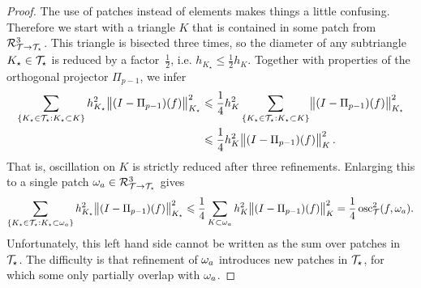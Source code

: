 \documentclass[thesis.tex]{subfiles}
\begin{document}
\begin{proof}

  The use of patches instead of elements makes things a little confusing. %
  Therefore we start with a triangle $K$ that is contained in some patch from $\mathcal{R}^3_{\mathcal{T} \to \mathcal{T}_\star}$.
  This triangle is bisected three times, so the diameter of any subtriangle $K_\star \in \mathcal{T}_\star$  is reduced by a factor~$\frac{1}{2}$, i.e. $h_{K_\star} \leq \frac{1}{2} h_K$.
  Together with properties of the orthogonal projector $\Pi_{p-1}$, we infer
  \begin{equation}
    \label{eq:strictosc}
  \begin{aligned}
    \sum_{\set{K_\star \in \mathcal{T}_\star : K_\star \subset K}} h^2_{K_\star} \norm{(I - \Pi_{p-1})(f)}^2_{K_\star} &\leqslant \frac{1}{4}h^2_K \sum_{\set{K_\star \in \mathcal{T}_\star : K_\star \subset K}} \norm{(I - \Pi_{p-1})(f)}^2_{K_\star} \\
    &\leqslant \frac{1}{4} h^2_K \norm{(I - \Pi_{p-1})(f)}^2_K.
  \end{aligned}
  \end{equation}
  That is, oscillation on $K$ is strictly reduced after three refinements. Enlarging this to a single patch $\omega_a \in \mathcal{R}^3_{\mathcal{T} \to \mathcal{T}_\star}$ gives
  \begin{equation}
    \label{eq:singlepatch}
    \sum_{\set{K_\star \in \mathcal{T}_\star : K_\star \subset \omega_a}} h^2_{K_\star} \norm{(I-\Pi_{p-1})(f)}^2_{K_\star} \leqslant \frac{1}{4} \sum_{K \subset \omega_a} h_K^2\norm{(I-\Pi_{p-1})(f)}_K^2 = \frac{1}{4} \operatorname{osc}_{\mathcal{T}}^2(f, \omega_a).
  \end{equation}
  Unfortunately, this left hand side cannot be written as the sum over patches in $\mathcal{T}_\star$.
  The difficulty is that refinement of $\omega_a$ introduces new patches in $\mathcal{T}_\star$, for which 
  some only partially overlap with $\omega_a$. 
  

\end{proof}
\end{document}
